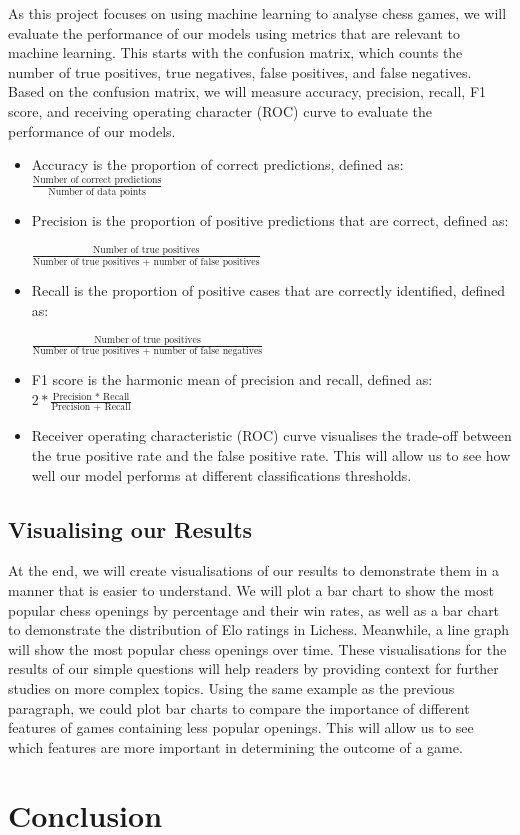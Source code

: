 \documentclass[%
 superscriptaddress,
showpacs,preprintnumbers,
 amsmath,
 amssymb,
 aps,
 pra,
showkeys,
onecolumn,
notitlepage,
11pt,
tightenlines      %
]{revtex4-1}
\begin{document}
As this project focuses on using machine learning to analyse chess games, we will evaluate the performance of our models using metrics that are relevant to machine learning. This starts with the confusion matrix, which counts the number of true positives, true negatives, false positives, and false negatives. Based on the confusion matrix, we will measure accuracy, precision, recall, F1 score, and receiving operating character (ROC) curve to evaluate the performance of our models.

\begin{itemize}
    \item Accuracy is the proportion of correct predictions, defined as: $\frac{\text{Number of correct predictions}}{\text{Number of data points}}$
    \item Precision is the proportion of positive predictions that are correct, defined as:
    
    $\frac{\text{Number of true positives}}{\text{Number of true positives + number of false positives}}$
    \item Recall is the proportion of positive cases that are correctly identified, defined as:
    
    $\frac{\text{Number of true positives}}{\text{Number of true positives + number of false negatives}}$
    \item F1 score is the harmonic mean of precision and recall, defined as: $2 * \frac{\text{Precision * Recall}}{\text{Precision + Recall}}$
    \item Receiver operating characteristic (ROC) curve visualises the trade-off between the true positive rate and the false positive rate. This will allow us to see how well our model performs at different classifications thresholds.
\end{itemize}

\subsection{Visualising our Results}
At the end, we will create visualisations of our results to demonstrate them in a manner that is easier to understand. We will plot a bar chart to show the most popular chess openings by percentage and their win rates, as well as a bar chart to demonstrate the distribution of Elo ratings in Lichess. Meanwhile, a line graph will show the most popular chess openings over time. These visualisations for the results of our simple questions will help readers by providing context for further studies on more complex topics. Using the same example as the previous paragraph, we could plot bar charts to compare the importance of different features of games containing less popular openings. This will allow us to see which features are more important in determining the outcome of a game.

\section{Conclusion}



\end{document}
